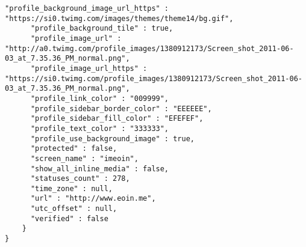 \begin{lstlisting}[caption=An example Twitter Streaming API response, label=lst:streamingapi]
      "profile_background_image_url_https" : "https://si0.twimg.com/images/themes/theme14/bg.gif",
      "profile_background_tile" : true,
      "profile_image_url" : "http://a0.twimg.com/profile_images/1380912173/Screen_shot_2011-06-03_at_7.35.36_PM_normal.png",
      "profile_image_url_https" : "https://si0.twimg.com/profile_images/1380912173/Screen_shot_2011-06-03_at_7.35.36_PM_normal.png",
      "profile_link_color" : "009999",
      "profile_sidebar_border_color" : "EEEEEE",
      "profile_sidebar_fill_color" : "EFEFEF",
      "profile_text_color" : "333333",
      "profile_use_background_image" : true,
      "protected" : false,
      "screen_name" : "imeoin",
      "show_all_inline_media" : false,
      "statuses_count" : 278,
      "time_zone" : null,
      "url" : "http://www.eoin.me",
      "utc_offset" : null,
      "verified" : false
    }
}
\end{lstlisting}
